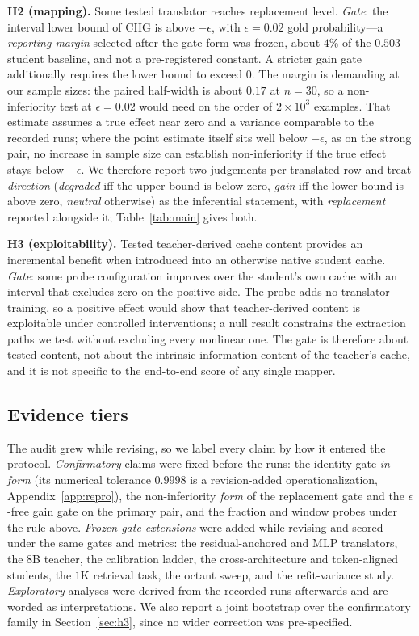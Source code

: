 \documentclass[10pt]{article}
\begin{document}
\textbf{H2 (mapping).} Some tested translator reaches replacement level.
\emph{Gate}: the interval lower bound of CHG is above $-\epsilon$, with
$\epsilon=0.02$ gold probability---a \emph{reporting margin} selected after the
gate form was frozen, about $4\%$ of the $0.503$ student baseline, and not a
pre-registered constant. A stricter gain gate additionally requires the lower
bound to exceed $0$. The margin is demanding at our sample sizes: the paired
half-width is about $0.17$ at $n{=}30$, so a non-inferiority test at
$\epsilon{=}0.02$ would need on the order of $2\times10^{3}$ examples. That
estimate assumes a true effect near zero and a variance comparable to the
recorded runs; where the point estimate itself sits well below $-\epsilon$, as
on the strong pair, no increase in sample size can establish non-inferiority if the true effect stays below $-\epsilon$. We
therefore report two judgements per translated row and treat \emph{direction}
(\emph{degraded} iff the upper bound is below zero, \emph{gain} iff the lower
bound is above zero, \emph{neutral} otherwise) as the inferential statement,
with \emph{replacement} reported alongside it; Table~\ref{tab:main} gives both.

\textbf{H3 (exploitability).} Tested teacher-derived cache content provides an
incremental benefit when introduced into an otherwise native student cache.
\emph{Gate}: some probe configuration improves over the student's own cache with
an interval that excludes zero on the positive side. The probe adds no translator
training, so a positive effect would show that teacher-derived content is
exploitable under controlled interventions; a null result constrains the
extraction paths we test without excluding every nonlinear one. The gate is
therefore about tested content, not about the intrinsic information content of
the teacher's cache, and it is not specific to the end-to-end score of any
single mapper.

\subsection{Evidence tiers}
\label{sec:tiers}
The audit grew while revising, so we label every claim by how it entered the
protocol. \emph{Confirmatory} claims were fixed before the runs: the identity
gate \emph{in form} (its numerical tolerance $0.9998$ is a revision-added
operationalization, Appendix~\ref{app:repro}), the non-inferiority
\emph{form} of the replacement gate and the
$\epsilon$-free gain gate on the primary pair, and the fraction and window
probes under the rule above. \emph{Frozen-gate extensions} were added while
revising and scored under the same gates and metrics: the residual-anchored and
MLP translators, the $8$B teacher, the calibration ladder, the
cross-architecture and token-aligned students, the $1$K retrieval task, the
octant sweep, and the refit-variance study. \emph{Exploratory} analyses were
derived from the recorded runs afterwards and are worded as interpretations. We
also report a joint bootstrap over the confirmatory family in
Section~\ref{sec:h3}, since no wider correction was pre-specified.
\end{document}
